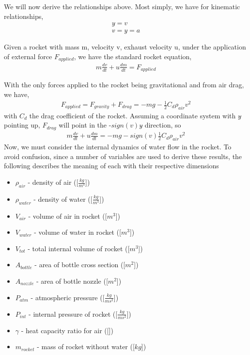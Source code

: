 \documentclass[12pt]{article}
\begin{document}
  We will now derive the relationships above. Most simply, we have for kinematic relationships,
  \begin{align}
    y\dot{} = v                             \\
    v\dot{} = y\ddot{} = a
  \end{align}
  
  Given a rocket with mass m, velocity v, exhaust velocity u, under the application of external force $F_{applied}$, we have the standard rocket equation,
  \begin{align}
  m\frac{dv}{dt}+u\frac{dm}{dt}=F_{applied}
  \end{align}
  
  With the only forces applied to the rocket being gravitational and from air drag, we have,
  \begin{align}
  F_{applied} = F_{gravity} + F_{drag} = -mg -\frac{1}{2}C_{d}\rho_{air}v^{2}
  \end{align}
  with $C_{d}$ the drag coefficient of the rocket. Assuming a coordinate system with $y\hat{}$ pointing up, $F_{drag}$ will point in the -$sign(v)y\hat{}$ direction, so 
  \begin{align}
  m\frac{dv}{dt}+u\frac{dm}{dt} = -mg - sign(v)\frac{1}{2}C_{d}\rho_{air}v^{2}
  \end{align}
  Now, we must consider the internal dynamics of water flow in the rocket. To avoid confusion, since a number of variables are used to derive these results, the following describes the meaning of each with their respective dimensions
  \begin{itemize}
  \item{$\rho_{air}$ - density of air ([$\frac{kg}{m^{3}}$])}
  \item{$\rho_{water}$ - density of water ([$\frac{kg}{m^{3}}$])}
  \item{$V_{air}$ - volume of air in rocket ([$m^{3}$])}
  \item{$V_{water}$ - volume of water in rocket ([$m^{3}$])}
  \item{$V_{tot}$ - total internal volume of rocket ([$m^{3}$])}
  \item{$A_{bottle}$ - area of bottle cross section ([$m^{2}$])}
  \item{$A_{nozzle}$ - area of bottle nozzle ([$m^{2}$])}
  \item{$P_{atm}$ - atmospheric pressure ([$\frac{kg}{ms^{2}}$])}
  \item{$P_{int}$ - internal pressure of rocket ([$\frac{kg}{ms^{2}}$])}
  \item{$\gamma$ - heat capacity ratio for air ([])}
  \item{$m_{rocket}$ - mass of rocket without water ([$kg$])}
  \end{itemize}
  
\end{document}
